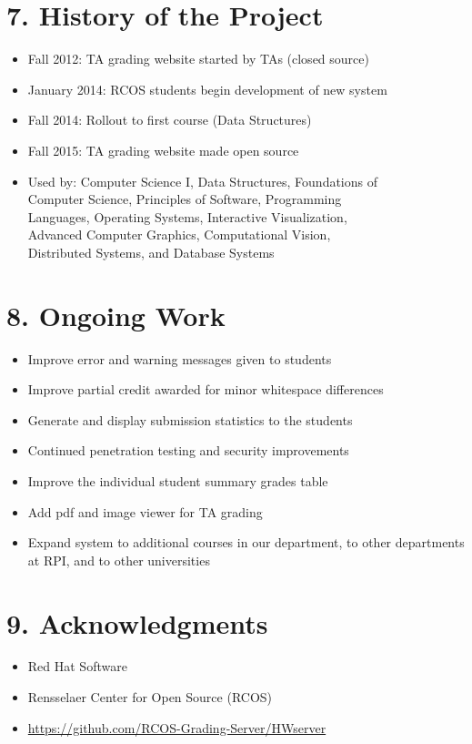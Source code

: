 \documentclass[thesis]{hmcposter}
\begin{document}
\begin{poster}
\section{7. History of the Project}%
\begin{itemize}
    \item Fall 2012: TA grading website started by TAs (closed source)
    \item January 2014: RCOS students begin development of new system
    \item Fall 2014: Rollout to first course (Data Structures)
    \item Fall 2015: TA grading website made open source 
    \item Used by: Computer Science I, Data Structures, Foundations of \\
          Computer Science, Principles of Software, Programming \\ 
          Languages, Operating Systems, Interactive Visualization, \\
          Advanced Computer Graphics, Computational Vision, \\
          Distributed Systems, and Database Systems
\end{itemize}

\section{8. Ongoing Work}%
\begin{itemize}
    \item Improve error and warning messages given to students
    \item Improve partial credit awarded for minor whitespace differences
    \item Generate and display submission statistics to the students
    \item Continued penetration testing and security improvements
    \item Improve the individual student summary grades table 
    \item Add pdf and image viewer for TA grading
    \item Expand system to additional courses in our department, to
      other departments at RPI, and to other universities
\end{itemize}

\section{9. Acknowledgments}
\begin{itemize}
    \item Red Hat Software
    \item Rensselaer Center for Open Source (RCOS)
    \item  \url{https://github.com/RCOS-Grading-Server/HWserver}
\end{itemize}

\end{poster}
\end{document}
